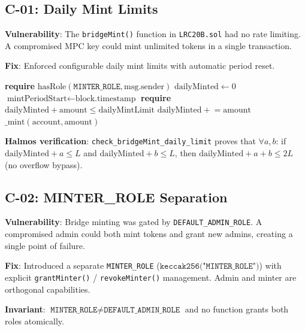 \documentclass[11pt]{article}
\begin{document}
\subsection{C-01: Daily Mint Limits}

\textbf{Vulnerability}: The \texttt{bridgeMint()} function in \texttt{LRC20B.sol} had no rate limiting. A compromised MPC key could mint unlimited tokens in a single transaction.

\textbf{Fix}: Enforced configurable daily mint limits with automatic period reset.

\begin{algorithm}[H]
\caption{C-01: Rate-Limited Bridge Mint}
\begin{algorithmic}[1]
    \State \textbf{require} $\text{hasRole}(\texttt{MINTER\_ROLE}, \text{msg.sender})$ 
        \State $\text{dailyMinted} \gets 0$
        \State $\text{mintPeriodStart} \gets \text{block.timestamp}$
    \EndIf
        \State \textbf{require} $\text{dailyMinted} + \text{amount} \leq \text{dailyMintLimit}$ 
        \State $\text{dailyMinted} \mathrel{+}= \text{amount}$
    \EndIf
    \State $\text{\_mint}(\text{account}, \text{amount})$
\EndFunction
\end{algorithmic}
\end{algorithm}

\textbf{Halmos verification}: \texttt{check\_bridgeMint\_daily\_limit} proves that $\forall a, b$: if $\text{dailyMinted} + a \leq L$ and $\text{dailyMinted} + b \leq L$, then $\text{dailyMinted} + a + b \leq 2L$ (no overflow bypass).

\subsection{C-02: MINTER\_ROLE Separation}

\textbf{Vulnerability}: Bridge minting was gated by \texttt{DEFAULT\_ADMIN\_ROLE}. A compromised admin could both mint tokens and grant new admins, creating a single point of failure.

\textbf{Fix}: Introduced a separate \texttt{MINTER\_ROLE} ($\texttt{keccak256("MINTER\_ROLE")}$) with explicit \texttt{grantMinter()} / \texttt{revokeMinter()} management. Admin and minter are orthogonal capabilities.

\textbf{Invariant}: $\texttt{MINTER\_ROLE} \neq \texttt{DEFAULT\_ADMIN\_ROLE}$ and no function grants both roles atomically.
\end{document}
